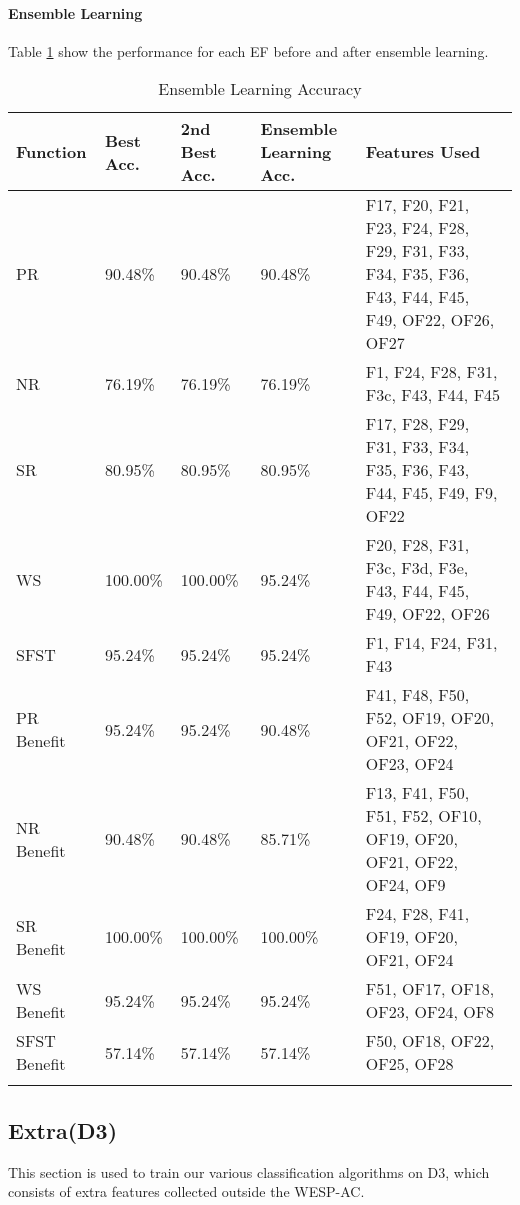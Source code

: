\documentclass[12pt,letterpaper]{article}
\begin{document}
\paragraph{Ensemble Learning}
Table \ref{tab_class_spec:ensemble_reduction} show the performance for each \ac{EF} before and after ensemble learning.

\begin{longtable}{|p{2cm}|p{2cm}|p{2cm}|p{2cm}|p{6cm}|}
\hline
\textbf{Function} & \textbf{Best Acc.} & \textbf{2nd Best Acc.} & \textbf{Ensemble Learning Acc.} & \textbf{Features Used} \\ \hline
PR & 90.48\% & 90.48\% & 90.48\% & F17, F20, F21, F23, F24, F28, F29, F31, F33, F34, F35, F36, F43, F44, F45, F49, OF22, OF26, OF27 \\ \hline
NR & 76.19\% & 76.19\% & 76.19\% & F1, F24, F28, F31, F3c, F43, F44, F45 \\ \hline
SR & 80.95\% & 80.95\% & 80.95\% & F17, F28, F29, F31, F33, F34, F35, F36, F43, F44, F45, F49, F9, OF22 \\ \hline
WS & 100.00\% & 100.00\% & 95.24\% & F20, F28, F31, F3c, F3d, F3e, F43, F44, F45, F49, OF22, OF26 \\ \hline
SFST & 95.24\% & 95.24\% & 95.24\% & F1, F14, F24, F31, F43 \\ \hline
PR Benefit & 95.24\% & 95.24\% & 90.48\% & F41, F48, F50, F52, OF19, OF20, OF21, OF22, OF23, OF24 \\ \hline
NR Benefit & 90.48\% & 90.48\% & 85.71\% & F13, F41, F50, F51, F52, OF10, OF19, OF20, OF21, OF22, OF24, OF9 \\ \hline
SR Benefit & 100.00\% & 100.00\% & 100.00\% & F24, F28, F41, OF19, OF20, OF21, OF24 \\ \hline
WS Benefit & 95.24\% & 95.24\% & 95.24\% & F51, OF17, OF18, OF23, OF24, OF8 \\ \hline
SFST Benefit & 57.14\% & 57.14\% & 57.14\% & F50, OF18, OF22, OF25, OF28 \\ \hline
\caption{Ensemble Learning Accuracy}
\label{tab_class_spec:ensemble_reduction}
\end{longtable}


\subsection{Extra(D3)}\label{sec:class_xtra}
This section is used to train our various classification algorithms on D3, which consists of extra features collected outside the WESP-AC.
\end{document}
